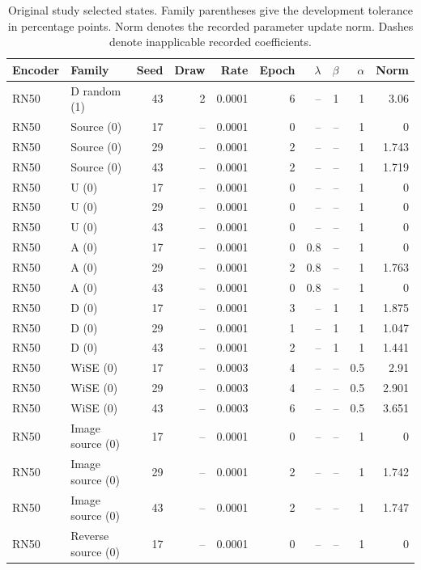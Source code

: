 \begin{table}[t]
\centering
\scriptsize
\setlength{\tabcolsep}{3pt}
\begin{tabular}{llrrrrrrrr}
\toprule
Encoder & Family & Seed & Draw & Rate & Epoch & $\lambda$ & $\beta$ & $\alpha$ & Norm\\
\midrule
RN50 & D random (1) & 43 & 2 & 0.0001 & 6 & -- & 1 & 1 & 3.06\\
RN50 & Source (0) & 17 & -- & 0.0001 & 0 & -- & -- & 1 & 0\\
RN50 & Source (0) & 29 & -- & 0.0001 & 2 & -- & -- & 1 & 1.743\\
RN50 & Source (0) & 43 & -- & 0.0001 & 2 & -- & -- & 1 & 1.719\\
RN50 & U (0) & 17 & -- & 0.0001 & 0 & -- & -- & 1 & 0\\
RN50 & U (0) & 29 & -- & 0.0001 & 0 & -- & -- & 1 & 0\\
RN50 & U (0) & 43 & -- & 0.0001 & 0 & -- & -- & 1 & 0\\
RN50 & A (0) & 17 & -- & 0.0001 & 0 & 0.8 & -- & 1 & 0\\
RN50 & A (0) & 29 & -- & 0.0001 & 2 & 0.8 & -- & 1 & 1.763\\
RN50 & A (0) & 43 & -- & 0.0001 & 0 & 0.8 & -- & 1 & 0\\
RN50 & D (0) & 17 & -- & 0.0001 & 3 & -- & 1 & 1 & 1.875\\
RN50 & D (0) & 29 & -- & 0.0001 & 1 & -- & 1 & 1 & 1.047\\
RN50 & D (0) & 43 & -- & 0.0001 & 2 & -- & 1 & 1 & 1.441\\
RN50 & WiSE (0) & 17 & -- & 0.0003 & 4 & -- & -- & 0.5 & 2.91\\
RN50 & WiSE (0) & 29 & -- & 0.0003 & 4 & -- & -- & 0.5 & 2.901\\
RN50 & WiSE (0) & 43 & -- & 0.0003 & 6 & -- & -- & 0.5 & 3.651\\
RN50 & Image source (0) & 17 & -- & 0.0001 & 0 & -- & -- & 1 & 0\\
RN50 & Image source (0) & 29 & -- & 0.0001 & 2 & -- & -- & 1 & 1.742\\
RN50 & Image source (0) & 43 & -- & 0.0001 & 2 & -- & -- & 1 & 1.747\\
RN50 & Reverse source (0) & 17 & -- & 0.0001 & 0 & -- & -- & 1 & 0\\
\bottomrule
\end{tabular}
\caption{Original study selected states. Family parentheses give the development tolerance in percentage points. Norm denotes the recorded parameter update norm. Dashes denote inapplicable recorded coefficients.}\label{tab:originalselected80}
\end{table}


